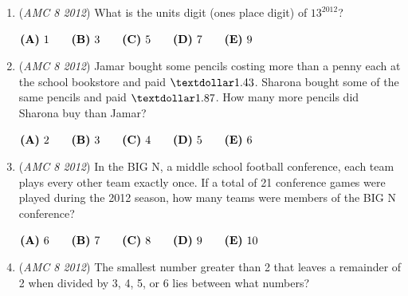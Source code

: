 \begin{enumerate}
 $\textbf{(A)}\hspace{.05in}5\qquad\textbf{(B)}\hspace{.05in}6\qquad\textbf{(C)}\hspace{.05in}7\qquad\textbf{(D)}\hspace{.05in}11\qquad\textbf{(E)}\hspace{.05in}12$


	\item (\textit{AMC 8 2012}) What is the units digit (ones place digit) of  $13^{2012}$?


 $\textbf{(A)}\hspace{.05in}1\qquad\textbf{(B)}\hspace{.05in}3\qquad\textbf{(C)}\hspace{.05in}5\qquad\textbf{(D)}\hspace{.05in}7\qquad\textbf{(E)}\hspace{.05in}9$


	\item (\textit{AMC 8 2012}) Jamar bought some pencils costing more than a penny each at the school bookstore and paid $\textdollar 1.43$. Sharona bought some of the same pencils and paid $\textdollar 1.87$. How many more pencils did Sharona buy than Jamar?


 $\textbf{(A)}\hspace{.05in}2\qquad\textbf{(B)}\hspace{.05in}3\qquad\textbf{(C)}\hspace{.05in}4\qquad\textbf{(D)}\hspace{.05in}5\qquad\textbf{(E)}\hspace{.05in}6$


	\item (\textit{AMC 8 2012}) In the BIG N, a middle school football conference, each team plays every other team exactly once. If a total of 21 conference games were played during the 2012 season, how many teams were members of the BIG N conference?


 $\textbf{(A)}\hspace{.05in}6\qquad\textbf{(B)}\hspace{.05in}7\qquad\textbf{(C)}\hspace{.05in}8\qquad\textbf{(D)}\hspace{.05in}9\qquad\textbf{(E)}\hspace{.05in}10$


	\item (\textit{AMC 8 2012}) The smallest number greater than 2 that leaves a remainder of 2 when divided by 3, 4, 5, or 6 lies between what numbers?



\end{enumerate}

